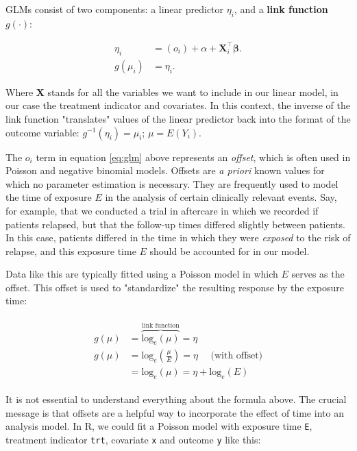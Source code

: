 GLMs consist of two components: a linear predictor $\eta_i$, and a \textbf{link function} $g(\cdot)$:

\begin{align}
\label{eq:glm}
\eta_i &= (o_i) +\alpha + \mathbf{X}_i^\top\mathbf{\beta}. \\
g(\mu_i) &= \eta_i.
\end{align}

Where $\mathbf{X}$ stands for all the variables we want to include in our linear model, in our case the treatment indicator and covariates. In this context, the inverse of the link function "translates" values of the linear predictor back into the format of the outcome variable: $g^{-1}(\eta_i) = \mu_i$; $\mu = E(Y_i)$. 

The $o_i$ term in equation \ref{eq:glm} above represents an \emph{offset}, which is often used in Poisson and negative binomial models. Offsets are \emph{a priori} known values for which no parameter estimation is necessary. They are frequently used to model the time of exposure $E$ in the analysis of certain clinically relevant events. Say, for example, that we conducted a trial in aftercare in which we recorded if patients relapsed, but that the follow-up times differed slightly between patients. In this case, patients differed in the time in which they were \emph{exposed} to the risk of relapse, and this exposure time $E$ should be accounted for in our model. 

Data like this are typically fitted using a Poisson model in which $E$ serves as the offset. This offset is used to "standardize" the resulting response by the exposure time:

\begin{align}
\begin{split}
g(\mu) &= \overbrace{\text{log}_e(\mu)}^{\text{link function}} = \eta \\
g(\mu) &= \text{log}_e\left(\frac{\mu}{E}\right) = \eta ~~~~~~ \text{(with offset)}\\
&= \text{log}_e(\mu) = \eta + \text{log}_e(E)
\end{split}
\end{align}

It is not essential to understand everything about the formula above. The crucial message is that offsets are a helpful way to incorporate the effect of time into an analysis model. In \textsf{R}, we could fit a Poisson model with exposure time \texttt{E}, treatment indicator \texttt{trt}, covariate \texttt{x} and outcome \texttt{y} like this:

